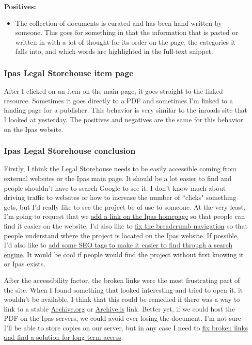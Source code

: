 \documentclass{article}
\begin{document}
    \noindent\textbf{Positives:}
    \begin{itemize}
    \itemsep0em 
        \item The collection of documents is curated and has been hand-written by someone. This goes for something in that the information that is pasted or written in with a lot of thought for its order on the page, the categories it falls into, and which words are highlighted in the full-text snippet.
    \end{itemize}

\subsubsection{Ipas Legal Storehouse item page}
After I clicked on an item on the main page, it goes straight to the linked resource. Sometimes it goes directly to a PDF and sometimes I'm linked to a landing page for a publisher. This behavior is very similar to the inroads site that I looked at yesterday. The positives and negatives are the same for this behavior on the Ipas website.

\subsubsection{Ipas Legal Storehouse conclusion}
Firstly, I think \ul{the Legal Storehouse needs to be easily accessible} coming from external websites or the Ipas main page. It should be a lot easier to find and people shouldn't have to search Google to see it. I don't know much about driving traffic to websites or how to increase the number of ``clicks" something gets, but I'd really like to see the project be of use to someone. At the very least, I'm going to request that we \ul{add a link on the Ipas homepage} so that people can find it easier on the website. I'd also like to \ul{fix the breadcrumb navigation} so that people understand where the project is located on the Ipas website. If possible, I'd also like to \ul{add some SEO tags to make it easier to find through a search engine}. It would be cool if people would find the project without first knowing it or Ipas exists.

After the accessibility factor, the broken links were the most frustrating part of the site. When I found something that looked interesting and tried to open it, it wouldn't be available. I think that this could be remedied if there was a way to link to a stable \href{http://archive.org/web/}{Archive.org} or \href{http://archive.is/}{Archive.is} link. Better yet, if we could host the PDF on the Ipas servers, we could avoid ever losing the document. I'm not sure I'll be able to store copies on our server, but in any case I need to \ul{fix broken links and find a solution for long-term access}.
\end{document}
